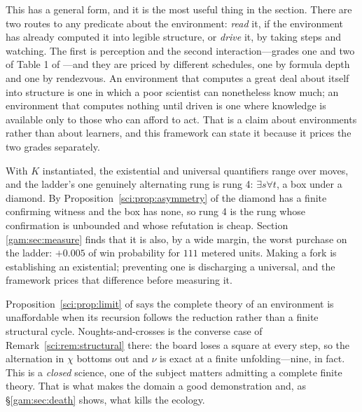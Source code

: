 This has a general form, and it is the most useful thing in the section. There
are two routes to any predicate about the environment: \emph{read} it, if the
environment has already computed it into legible structure, or \emph{drive} it,
by taking steps and watching. The first is perception and the second
interaction---grades one and two of Table 1 of \chSci---and they are
priced by different schedules, one by formula depth and one by rendezvous. An
environment that computes a great deal about itself into structure is one in
which a poor scientist can nonetheless know much; an environment that computes
nothing until driven is one where knowledge is available only to those who can
afford to act. That is a claim about environments rather than about learners,
and this framework can state it because it prices the two grades separately.

\begin{observation}\label{gam:obs:asym}
With $K$ instantiated, the existential and universal quantifiers range over
moves, and the ladder's one genuinely alternating rung is rung 4:
$\exists s \forall t$, a box under a diamond. By Proposition~\ref{sci:prop:asymmetry} of
\chSci the diamond has a finite confirming witness and the box has
none, so rung 4 is the rung whose confirmation is unbounded and whose refutation
is cheap. Section \ref{gam:sec:measure} finds that it is also, by a wide margin, the
worst purchase on the ladder: $+0.005$ of win probability for $111$ metered
units. Making a fork is establishing an existential; preventing one is
discharging a universal, and the framework prices that difference before
measuring it.
\end{observation}

\begin{remark}\label{gam:why-reachable-here-what}
Proposition~\ref{sci:prop:limit} of \chSci says the complete theory of an environment is
unaffordable when its recursion follows the reduction rather than a finite
structural cycle. Noughts-and-crosses is the converse case of Remark~\ref{sci:rem:structural} there:
the board loses a square at every step, so the alternation in $\chi$ bottoms out
and $\nu$ is exact at a finite unfolding---nine, in fact. This is a \emph{closed}
science, one of the subject matters admitting a complete finite theory. That is
what makes the domain a good demonstration and, as \S\ref{gam:sec:death} shows, what
kills the ecology.
\end{remark}


